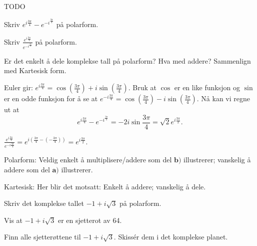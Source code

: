 \begin{losning}
TODO
\end{losning}


\begin{oppgave}

\begin{punkt}
Skriv $e^{i\frac{3\pi}{4}}-e^{-i^\frac{3 \pi}{4}}$ på polarform.
\end{punkt}

\begin{punkt}
Skriv $\frac{e^{i\frac{3\pi}{4}}}{e^{-i^\frac{3 \pi}{4}}}$ på polarform.
\end{punkt}

\begin{punkt}
Er det enkelt å dele komplekse tall på polarform? Hva med addere? Sammenlign med Kartesisk form.
\end{punkt}

\end{oppgave}

\begin{losning}

\begin{punkt}
Euler gir: $e^{i\frac{3\pi}{4}}=\cos(\frac{3\pi}{4})+i\sin (\frac{3\pi}{4})$. Bruk at $\cos$ er en like funksjon og $\sin$ er en odde funksjon for å se at $e^{-i\frac{3\pi}{4}}=\cos(\frac{3\pi}{4})-i\sin (\frac{3\pi}{4})$. Nå kan vi regne ut at $$e^{i\frac{3\pi}{4}}-e^{-i^\frac{3 \pi}{4}}=-2i\sin \frac{3\pi}{4}=\sqrt{2}e^{i\frac{3\pi}{2}}.$$
\end{punkt}

\begin{punkt}
$\frac{e^{i\frac{3\pi}{4}}}{e^{-i\frac{3 \pi}{4}}}=e^{i(\frac{3\pi}{4}-(-\frac{3 \pi}{4}))}=e^{i\frac{3\pi}{2}}.$ 
\end{punkt}

\begin{punkt}
Polarform: Veldig enkelt å multiplisere/addere som del $\textbf{b)}$ illustrerer; vanskelig å addere som del $\textbf{a)}$ illustrerer.

\noindent
Kartesisk: Her blir det motsatt: Enkelt å addere; vanskelig å dele.
\end{punkt}

\end{losning}



\begin{oppgave}
\begin{punkt}
Skriv det komplekse tallet $-1+i\sqrt{3}$ på polarform.
\end{punkt}

\begin{punkt}
Vis at $-1+i\sqrt{3}$ er en sjetterot av 64.
\end{punkt}

\begin{punkt}
Finn alle sjetterøttene til $-1+i\sqrt{3}$. Skissér dem i det komplekse planet.
\end{punkt}

\end{oppgave}

